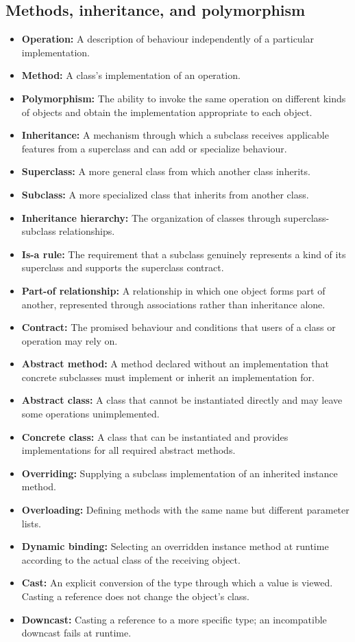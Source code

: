 \documentclass[11pt]{article}
\newenvironment{DottedList}{%
  \begin{itemize}[leftmargin=2em, itemsep=0.35em, topsep=0.35em, label=\textbullet]
}{%
  \end{itemize}
}
\begin{document}
\subsection*{Methods, inheritance, and polymorphism}
\begin{DottedList}
  \item \textbf{Operation:} A description of behaviour independently of a particular implementation.
  \item \textbf{Method:} A class's implementation of an operation.
  \item \textbf{Polymorphism:} The ability to invoke the same operation on different kinds of objects and obtain the implementation appropriate to each object.
  \item \textbf{Inheritance:} A mechanism through which a subclass receives applicable features from a superclass and can add or specialize behaviour.
  \item \textbf{Superclass:} A more general class from which another class inherits.
  \item \textbf{Subclass:} A more specialized class that inherits from another class.
  \item \textbf{Inheritance hierarchy:} The organization of classes through superclass-subclass relationships.
  \item \textbf{Is-a rule:} The requirement that a subclass genuinely represents a kind of its superclass and supports the superclass contract.
  \item \textbf{Part-of relationship:} A relationship in which one object forms part of another, represented through associations rather than inheritance alone.
  \item \textbf{Contract:} The promised behaviour and conditions that users of a class or operation may rely on.
  \item \textbf{Abstract method:} A method declared without an implementation that concrete subclasses must implement or inherit an implementation for.
  \item \textbf{Abstract class:} A class that cannot be instantiated directly and may leave some operations unimplemented.
  \item \textbf{Concrete class:} A class that can be instantiated and provides implementations for all required abstract methods.
  \item \textbf{Overriding:} Supplying a subclass implementation of an inherited instance method.
  \item \textbf{Overloading:} Defining methods with the same name but different parameter lists.
  \item \textbf{Dynamic binding:} Selecting an overridden instance method at runtime according to the actual class of the receiving object.
  \item \textbf{Cast:} An explicit conversion of the type through which a value is viewed. Casting a reference does not change the object's class.
  \item \textbf{Downcast:} Casting a reference to a more specific type; an incompatible downcast fails at runtime.
\end{DottedList}
\end{document}
